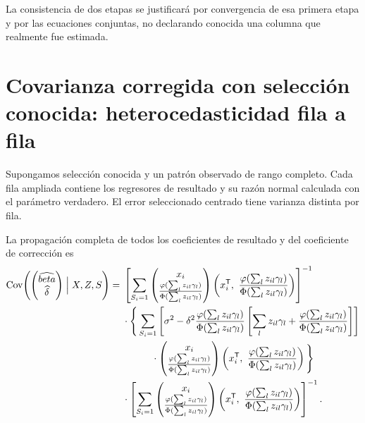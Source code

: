 \documentclass[11pt,a4paper]{article}
\newcommand{\T}{^{\mathsf T}}
\DeclareMathOperator{\Cov}{Cov}
\begin{document}
La consistencia de dos etapas
se justificará por convergencia
de esa primera etapa
y por las ecuaciones conjuntas,
no declarando conocida una
columna que realmente fue estimada.

\clearpage
\section{Covarianza corregida con selección conocida: heterocedasticidad fila a fila}\label{unidad131}

Supongamos selección conocida y un patrón observado de rango completo.
Cada fila ampliada contiene los regresores de resultado y su
razón normal calculada con el parámetro verdadero.
El error seleccionado centrado tiene varianza distinta por fila.

La propagación completa de todos los coeficientes
de resultado y del coeficiente de corrección es
\[
\begin{aligned}
\Cov\!\left(\begin{pmatrix}\widehat\beta\\\widehat\delta\end{pmatrix}
\Bigm|X,Z,S\right)
={}&\left[\sum_{S_i=1}\begin{pmatrix}x_i\\\frac{\varphi(\sum_lz_{il}\gamma_l)}{\Phi(\sum_lz_{il}\gamma_l)}\end{pmatrix}\left(x_i\T,\ \frac{\varphi(\sum_lz_{il}\gamma_l)}{\Phi(\sum_lz_{il}\gamma_l)}\right)\right]^{-1}\\
&\cdot\Bigg\{\sum_{S_i=1}
\left[\sigma^2-\delta^2\frac{\varphi(\sum_lz_{il}\gamma_l)}{\Phi(\sum_lz_{il}\gamma_l)}\left[\sum_lz_{il}\gamma_l+\frac{\varphi(\sum_lz_{il}\gamma_l)}{\Phi(\sum_lz_{il}\gamma_l)}\right]\right]\\
&\qquad\quad\cdot\begin{pmatrix}x_i\\\frac{\varphi(\sum_lz_{il}\gamma_l)}{\Phi(\sum_lz_{il}\gamma_l)}\end{pmatrix}\left(x_i\T,\ \frac{\varphi(\sum_lz_{il}\gamma_l)}{\Phi(\sum_lz_{il}\gamma_l)}\right)\Bigg\}\\
&\cdot\left[\sum_{S_i=1}\begin{pmatrix}x_i\\\frac{\varphi(\sum_lz_{il}\gamma_l)}{\Phi(\sum_lz_{il}\gamma_l)}\end{pmatrix}\left(x_i\T,\ \frac{\varphi(\sum_lz_{il}\gamma_l)}{\Phi(\sum_lz_{il}\gamma_l)}\right)\right]^{-1}.
\end{aligned}
\]
\end{document}
